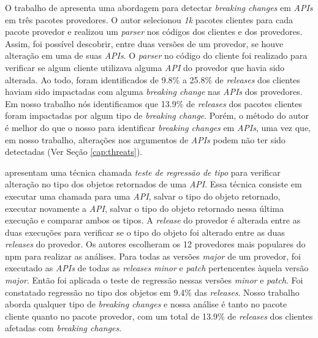 O trabalho de  apresenta uma abordagem para detectar \textit{breaking changes} em \textit{APIs} em três pacotes provedores. O autor selecionou \textit{1k} pacotes clientes para cada pacote provedor e realizou um \textit{parser} nos códigos dos clientes e dos provedores. Assim, foi possível descobrir, entre duas versões de um provedor, se houve alteração em uma de suas \textit{APIs}. O \textit{parser} no código do cliente foi realizado para verificar se algum cliente utilizava alguma \textit{API} do provedor que havia sido alterada. Ao todo, foram identificados de 9.8\% a 25.8\% de \textit{releases} dos clientes haviam sido impactadas com alguma \textit{breaking change} nas \textit{APIs} dos provedores. Em nosso trabalho nós identificamos que 13.9\% de \textit{releases} dos pacotes clientes foram impactadas por algum tipo de \textit{breaking change}. Porém, o método do autor é melhor do que o nosso para identificar \textit{breaking changes} em \textit{APIs}, uma vez que, em nosso trabalho, alterações nos argumentos de \textit{APIs} podem não ter sido detectadas (Ver Seção \ref{cap:threats}).

 apresentam uma técnica chamada \textit{teste de regressão de tipo} para verificar alteração no tipo dos objetos retornados de uma \textit{API}. Essa técnica consiste em executar uma chamada para uma \textit{API}, salvar o tipo do objeto retornado, executar novamente a \textit{API}, salvar o tipo do objeto retornado nessa última execução e comparar ambos os tipos. A \textit{release} do provedor é alterada entre as duas execuções para verificar se o tipo do objeto foi alterado entre as duas \textit{releases} do provedor. Os autores escolheram os 12 provedores mais populares do \textsf{npm} para realizar as análises. Para todas as versões \textit{major} de um provedor, foi executado as \textit{APIs} de todas as \textit{releases minor} e \textit{patch} pertencentes àquela versão \textit{major}. Então foi aplicada o teste de regressão nessas versões \textit{minor} e \textit{patch}. Foi constatado regressão no tipo dos objetos em 9.4\% das \textit{releases}. Nosso trabalho aborda qualquer tipo de \textit{breaking changes} e nossa análise é tanto no pacote cliente quanto no pacote provedor, com um total de 13.9\% de \textit{releases} dos clientes afetadas com \textit{breaking changes}.

